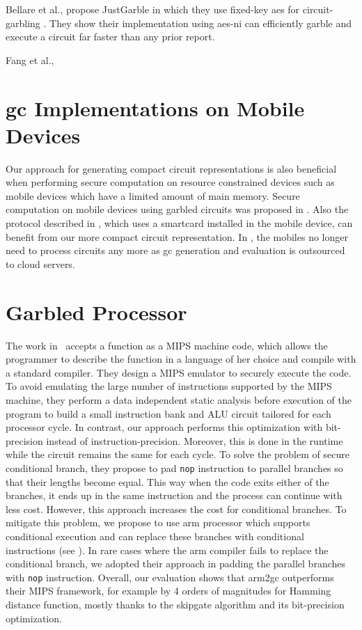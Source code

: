 Bellare et al., propose JustGarble in which they use fixed-key \acrshort{aes} for circuit-garbling \cite{bellare2013efficient}.
They show their implementation using \acrshort{aes-ni} can efficiently garble and execute a circuit far faster than any prior report.

Fang et al., \cite{fang2017secure}

\section{\acrshort{gc} Implementations on Mobile Devices} \label{sec:related-mobile}
Our approach for generating compact circuit representations is also beneficial when performing secure computation on resource constrained devices such as mobile devices which have a limited amount of main memory.
Secure computation on mobile devices using garbled circuits was proposed in \cite{huang2011privacy}.
Also the protocol described in \cite{demmler2014ad}, which uses a smartcard installed in the mobile device, can benefit from our more compact circuit representation.
In \cite{carter2016secure, carter2014whitewash}, the mobiles no longer need to process circuits any more as \acrshort{gc} generation and evaluation is outsourced to cloud servers.

\section{Garbled Processor}\label{sec:related-processor}
The work in~\cite{wang2016secure} accepts a function as a MIPS machine code, which allows the programmer to describe the function in a language of her choice and compile with a standard compiler.
They design a MIPS emulator to securely execute the code.
To avoid emulating the large number of instructions supported by the MIPS machine, they perform a data independent static analysis before execution of the program to build a small instruction bank and ALU circuit tailored for each processor cycle.
In contrast, our approach performs this optimization with bit-precision instead of instruction-precision.
Moreover, this is done in the runtime while the circuit remains the same for each cycle.
To solve the problem of secure conditional branch, they propose to pad \texttt{nop} instruction to parallel branches so that their lengths become equal.
This way when the code exits either of the branches, it ends up in the same instruction and the process can continue with less cost.
However, this approach increases the cost for conditional branches.
To mitigate this problem, we propose to use \gls{arm} processor which supports conditional execution and can replace these branches with conditional instructions (see ).
In rare cases where the \gls{arm} compiler fails to replace the conditional branch, we adopted their approach in padding the parallel branches with \texttt{nop} instruction.
Overall, our evaluation shows that \gls{arm2gc} outperforms their MIPS framework, for example by 4 orders of magnitudes for Hamming distance function, mostly thanks to the \gls{skipgate} algorithm and its bit-precision optimization.
